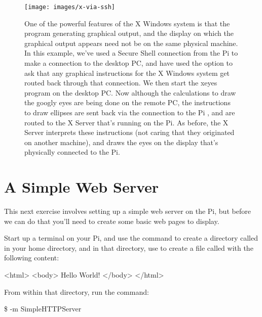 \begin{figure}
\centerline{\texttt{[image: images/x-via-ssh]}}
\caption{One of the powerful features of the X Windows system is that the program generating graphical output, and the display on which the graphical output appears need not be on the same physical machine. In this example, we've used a Secure Shell connection from the Pi \protect{} to make a connection to the desktop PC, and have used the  option to ask that any graphical instructions for the X Windows system get routed back through that connection. We then start the xeyes program on the desktop PC. Now although the calculations to draw the googly eyes are being done on the remote PC, the instructions to draw ellipses are sent back via the  connection to the Pi  \protect{}, and are \protect{} routed to the X Server that's running on the Pi. As before, the X Server \protect{} interprets these instructions (not caring that they originated on another machine), and draws the eyes on the display that's physically connected to the Pi.}\label{figure:x-via-ssh}
\end{figure}





\section{A Simple Web Server}

This next exercise involves setting up a simple web server on the Pi, but before we can do that you'll need to create some basic web pages to display.

Start up a terminal on your Pi, and use the  command to create a directory called  in your home directory, and in that directory, use  to create a file called  with the following content:

\begin{ttoutenv}
<html>
  <body>
    Hello World!
  </body>
</html>
\end{ttoutenv}

From within that directory, run the command:

\begin{ttoutenv}
\$  -m SimpleHTTPServer
\end{ttoutenv}

